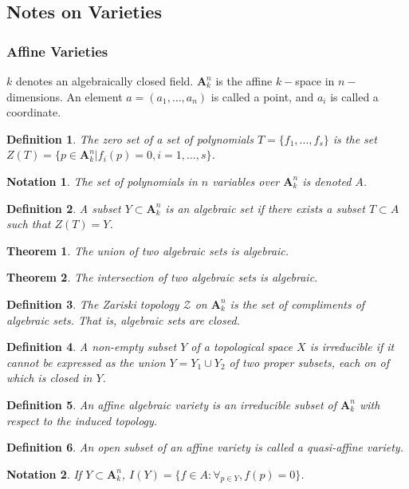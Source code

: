 \documentclass[oneside]{book}
\theoremstyle{mystyle}
\newtheorem{theorem}{Theorem}[section]
\newtheorem{definition}{Definition}[section]
\newtheorem{notation}{Notation}[section]
\begin{document}
\subsection{Notes on Varieties}
\subsubsection{Affine Varieties}
$k$ denotes an algebraically closed field. $\textbf{A}_{k}^n$ is the affine $k-$space in $n-$dimensions. An element $a=(a_1,\hdots, a_n)$ is called a point, and $a_i$ is called a coordinate.
\begin{definition}
The zero set of a set of polynomials $T = \{f_1,\hdots, f_s\}$ is the set $Z(T) = \{p\in \textbf{A}_k^n|f_i(p) = 0,i=1,\hdots, s\}$.
\end{definition}
\begin{notation}
The set of polynomials in $n$ variables over $\textbf{A}_k^n$ is denoted $A$.
\end{notation}
\begin{definition}
A subset $Y\subset \textbf{A}_k^n$ is an algebraic set if there exists a subset $T\subset A$ such that $Z(T) = Y$.
\end{definition}
\begin{theorem}
The union of two algebraic sets is algebraic.
\end{theorem}
\begin{theorem}
The intersection of two algebraic sets is algebraic.
\end{theorem}
\begin{definition}
The Zariski topology $\mathcal{Z}$ on $\textbf{A}_{k}^n$ is the set of compliments of algebraic sets. That is, algebraic sets are closed.
\end{definition}
\begin{definition}
A non-empty subset $Y$ of a topological space $X$ is irreducible if it cannot be expressed as the union $Y=Y_1\cup Y_2$ of two proper subsets, each on of which is closed in $Y$.
\end{definition}
\begin{definition}
An affine algebraic variety is an irreducible subset of $\textbf{A}_k^n$ with respect to the induced topology.
\end{definition}
\begin{definition}
An open subset of an affine variety is called a quasi-affine variety.
\end{definition}
\begin{notation}
If $Y\subset \textbf{A}_k^n$, $I(Y) = \{f\in A:\forall_{p\in Y}, f(p) = 0\}$.
\end{notation}
\end{document}
